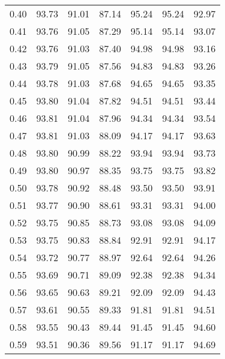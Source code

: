 \begin{tabular}{|c|c|c|c|c|c|c|}
      0.40 &     93.73 &     91.01 &      87.14 &   95.24 &      95.24 &         92.97 \\
      0.41 &     93.76 &     91.05 &      87.29 &   95.14 &      95.14 &         93.07 \\
      0.42 &     93.76 &     91.03 &      87.40 &   94.98 &      94.98 &         93.16 \\
      0.43 &     93.79 &     91.05 &      87.56 &   94.83 &      94.83 &         93.26 \\
      0.44 &     93.78 &     91.03 &      87.68 &   94.65 &      94.65 &         93.35 \\
      0.45 &     93.80 &     91.04 &      87.82 &   94.51 &      94.51 &         93.44 \\
      0.46 &     93.81 &     91.04 &      87.96 &   94.34 &      94.34 &         93.54 \\
      0.47 &     93.81 &     91.03 &      88.09 &   94.17 &      94.17 &         93.63 \\
      0.48 &     93.80 &     90.99 &      88.22 &   93.94 &      93.94 &         93.73 \\
      0.49 &     93.80 &     90.97 &      88.35 &   93.75 &      93.75 &         93.82 \\
      0.50 &     93.78 &     90.92 &      88.48 &   93.50 &      93.50 &         93.91 \\
      0.51 &     93.77 &     90.90 &      88.61 &   93.31 &      93.31 &         94.00 \\
      0.52 &     93.75 &     90.85 &      88.73 &   93.08 &      93.08 &         94.09 \\
      0.53 &     93.75 &     90.83 &      88.84 &   92.91 &      92.91 &         94.17 \\
      0.54 &     93.72 &     90.77 &      88.97 &   92.64 &      92.64 &         94.26 \\
      0.55 &     93.69 &     90.71 &      89.09 &   92.38 &      92.38 &         94.34 \\
      0.56 &     93.65 &     90.63 &      89.21 &   92.09 &      92.09 &         94.43 \\
      0.57 &     93.61 &     90.55 &      89.33 &   91.81 &      91.81 &         94.51 \\
      0.58 &     93.55 &     90.43 &      89.44 &   91.45 &      91.45 &         94.60 \\
      0.59 &     93.51 &     90.36 &      89.56 &   91.17 &      91.17 &         94.69 \\

\end{tabular}
